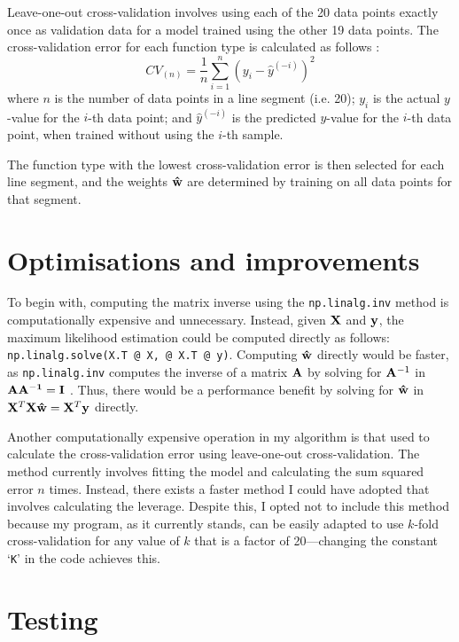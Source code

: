 \documentclass[onecolumn, 12pt, a4paper]{article}
\begin{document}
Leave-one-out cross-validation involves using each of
the 20 data points exactly once as validation data for a model
trained using the other 19 data points. 
The cross-validation error for each function type is calculated
as follows \cite{Stanford}:
\[
    CV_{(n)} = \frac{1}{n} \sum_{i = 1}^{n} (y_{i} - \hat{y}^{(-i)})^{2}
\]
where
$n$ is the number of data points in a line segment (i.e. 20);
$y_{i}$ is the actual $y$-value for the $i$-th data point;
and $\hat{y}^{(-i)}$ is the predicted $y$-value for the $i$-th
data point, when trained without using the $i$-th sample.

The function type with the lowest cross-validation error
is then selected for each line segment,
and the weights $\vb{\hat{w}}$ are determined by training on all
data points for that segment.

\section{Optimisations and improvements}

To begin with,
computing the matrix inverse using the \texttt{np.linalg.inv}
method is computationally expensive and unnecessary.
Instead, given $\vb{X}$ and $\vb{y}$, the maximum likelihood
estimation could be computed directly as follows:
\texttt{np.linalg.solve(X.T @ X, @ X.T @ y)}.
Computing $\vb{\hat{w}}$ directly would be faster, as \texttt{np.linalg.inv}
computes the inverse of a matrix $\vb{A}$ by solving for $\vb{A}^{-1}$
in $\vb{AA^{-1} = I}$ \cite{StackOverflow}.
Thus, there would be a performance benefit by solving for
$\vb{\hat{w}}$ in
$\vb{X}^{T} \vb{X} \vb{\hat{w}} = \vb{X}^{T} \vb{y}$ directly.

Another computationally expensive operation in my
algorithm is that used to calculate the cross-validation error 
using leave-one-out cross-validation.
The method currently involves
fitting the model and calculating the sum squared error
$n$ times. 
Instead, there exists a faster method I could have
adopted that involves calculating the leverage.
Despite this, I opted not to include this method 
because my program, as it currently stands, can be 
easily adapted to use $k$-fold cross-validation for 
any value of $k$ that is a factor of 20---changing
the constant `\texttt{K}' in the code achieves this.

\section{Testing}
\end{document}
